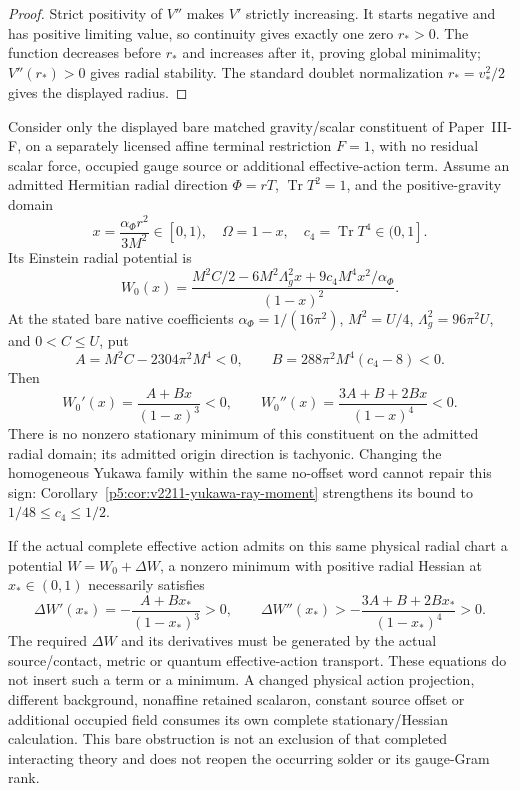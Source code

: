 \documentclass[12pt,a4paper]{article}
\begin{document}
\begin{proof}
Strict positivity of \(V''\) makes \(V'\) strictly increasing.  It starts
negative and has positive limiting value, so continuity gives exactly one
zero \(r_*>0\).  The function decreases before \(r_*\) and increases after
it, proving global minimality; \(V''(r_*)>0\) gives radial stability.  The
standard doublet normalization \(r_*=v_*^2/2\) gives the displayed radius.
\end{proof}

\begin{proposition}
\label{p7:prop:v2211-bare-terminal-scalar-contact-target}
Consider only the displayed bare matched gravity/scalar constituent of
Paper~III-F, on a separately licensed affine terminal restriction \(F=1\),
with no residual scalar force, occupied gauge source or additional
effective-action term.  Assume an admitted Hermitian radial direction
\(\Phi=rT\), \(\operatorname{Tr}T^2=1\), and the positive-gravity domain
\[
 x=\frac{\alpha_\Phi r^2}{3M^2}\in[0,1),\quad
 \Omega=1-x,\quad c_4=\operatorname{Tr}T^4\in(0,1].
\]
Its Einstein radial potential is
\[
 W_0(x)=\frac{M^2C/2-6M^2\Lambda_g^2x
              +9c_4M^4x^2/\alpha_\Phi}{(1-x)^2}.
\]
At the stated bare native coefficients
\(\alpha_\Phi=1/(16\pi^2)\), \(M^2=U/4\),
\(\Lambda_g^2=96\pi^2U\), and \(0<C\le U\), put
\[
 A=M^2C-2304\pi^2M^4<0,
 \qquad B=288\pi^2M^4(c_4-8)<0.
\]
Then
\[
 \boxed{W_0'(x)=\frac{A+Bx}{(1-x)^3}<0,\qquad
 W_0''(x)=\frac{3A+B+2Bx}{(1-x)^4}<0.}
\]
There is no nonzero stationary minimum of this constituent on the
admitted radial domain; its admitted origin direction is tachyonic.
Changing the homogeneous Yukawa family within the same no-offset word
cannot repair this sign: Corollary~\ref{p5:cor:v2211-yukawa-ray-moment}
strengthens its bound to \(1/48\le c_4\le1/2\).

If the actual complete effective action admits on this same physical
radial chart a potential \(W=W_0+\Delta W\), a nonzero minimum with
positive radial Hessian at \(x_*\in(0,1)\) necessarily satisfies
\[
 \boxed{\Delta W'(x_*)=-\frac{A+Bx_*}{(1-x_*)^3}>0,\qquad
 \Delta W''(x_*)>-\frac{3A+B+2Bx_*}{(1-x_*)^4}>0.}
\]
The required \(\Delta W\) and its derivatives must be generated by the
actual source/contact, metric or quantum effective-action transport.
These equations do not insert such a term or a minimum.  A changed
physical action projection, different background, nonaffine retained
scalaron, constant source offset or additional occupied field consumes
its own complete stationary/Hessian calculation.  This bare obstruction
is not an exclusion of that completed interacting theory and does not
reopen the occurring solder or its gauge-Gram rank.
\end{proposition}
\end{document}
